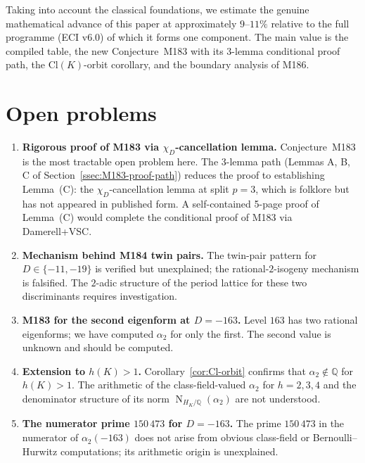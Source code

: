 \documentclass[12pt]{amsart}
\theoremstyle{definition}
\DeclareMathOperator{\Nm}{N}
\newcommand{\Q}{\mathbb{Q}}
\begin{document}
Taking into account the classical foundations, we estimate the genuine
mathematical advance of this paper at approximately $9$--$11\%$ relative
to the full programme (ECI v6.0) of which it forms one component.
The main value is the compiled table, the new Conjecture~M183 with its
3-lemma conditional proof path, the $\mathrm{Cl}(K)$-orbit corollary,
and the boundary analysis of M186.

\section{Open problems}
\label{sec:open}

\begin{enumerate}
  \item \textbf{Rigorous proof of M183 via $\chi_D$-cancellation lemma.}
    Conjecture~M183 is the most tractable open problem here.
    The 3-lemma path (Lemmas A, B, C of Section~\ref{ssec:M183-proof-path})
    reduces the proof to establishing Lemma~(C): the $\chi_D$-cancellation
    lemma at split $p=3$, which is folklore but has not appeared in published
    form.
    A self-contained 5-page proof of Lemma~(C) would complete the conditional
    proof of M183 via Damerell+VSC.

  \item \textbf{Mechanism behind M184 twin pairs.}
    The twin-pair pattern for $D \in \{-11,-19\}$ is verified but unexplained;
    the rational-$2$-isogeny mechanism is falsified.
    The $2$-adic structure of the period lattice for these two discriminants
    requires investigation.

  \item \textbf{M183 for the second eigenform at $D=-163$.}
    Level $163$ has two rational eigenforms; we have computed $\alpha_2$ for
    only the first. The second value is unknown and should be computed.

  \item \textbf{Extension to $h(K) > 1$.}
    Corollary~\ref{cor:Cl-orbit} confirms that $\alpha_2 \notin \Q$ for
    $h(K) > 1$.
    The arithmetic of the class-field-valued $\alpha_2$ for $h=2,3,4$
    and the denominator structure of its norm $\Nm_{H_K/\Q}(\alpha_2)$
    are not understood.

  \item \textbf{The numerator prime $150\,473$ for $D = -163$.}
    The prime $150\,473$ in the numerator of $\alpha_2(-163)$ does not arise
    from obvious class-field or Bernoulli--Hurwitz computations; its arithmetic
    origin is unexplained.


\end{enumerate}
\end{document}
